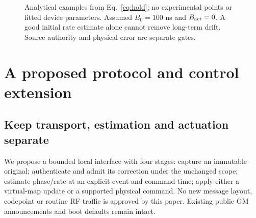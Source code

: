 \documentclass[11pt,letterpaper]{article}
\begin{document}
\begin{figure}[htbp]
\centering
{}
\caption{Analytical examples from Eq.~\ref{eq:hold}; no experimental points or fitted device parameters. Assumed $B_0=100$ ns and $B_{\rm act}=0$. A good initial rate estimate alone cannot remove long-term drift. Source authority and physical error are separate gates.}
\end{figure}

\section{A proposed protocol and control extension}
\subsection{Keep transport, estimation and actuation separate}
We propose a bounded local interface with four stages: capture an immutable original; authenticate and admit its correction under the unchanged scope; estimate phase/rate at an explicit event and command time; apply either a virtual-map update or a supported physical command. No new message layout, codepoint or routine RF traffic is approved by this paper. Existing public GM announcements and boot defaults remain intact.
\end{document}
